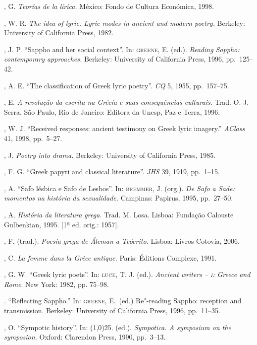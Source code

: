 \begin{bibliohedra}
, G. \textit{Teorías de la lírica.} México: Fondo de
Cultura Económica, 1998.

, W. R. \textit{The idea of lyric. Lyric modes in ancient and
modern poetry.} Berkeley: University of California Press, 1982.

, J. P. “Sappho and her social context”. In: \textsc{greene}, E.
(ed.). \textit{Reading Sappho: contemporary approaches.} Berkeley: University
of California Press, 1996, pp.~125--42.

, A. E. “The classification of Greek lyric poetry”. \textit{CQ}
5, 1955, pp.~157--75.

, E. \textit{A revolução da escrita na Grécia e suas
consequências culturais.} Trad. O. J. Serra. São Paulo, Rio de Janeiro: Editora
da Unesp, Paz e Terra, 1996.

, W. J. ``Received responses: ancient testimony on Greek lyric imagery.'' 
\textit{AClass} 41, 1998, pp.~5--27. 

, J. \textit{Poetry into drama.} Berkeley: University of
California Press, 1985.

, F. G. “Greek papyri and classical literature”.
\textit{JHS} 39, 1919, pp.~1--15.

, A. “Safo lésbica e Safo de Lesbos”. In: \textsc{bremmer}, J.
(org.). \textit{De Safo a Sade: momentos na história da sexualidade.} Campinas:
Papirus, 1995, pp.~27--50.

, A. \textit{História da literatura grega.} Trad. M. Losa. Lisboa:
Fundação Calouste Gulbenkian, 1995. [1ª ed. orig.: 1957].

, F. (trad.). \textit{Poesia grega de Álcman a Teócrito.}
Lisboa: Livros Cotovia, 2006.

, C. \textit{La femme dans la Grèce antique.} Paris: Éditions
Complexe, 1991.

, G. W. “Greek lyric poets”. In: \textsc{luce}, T. J. (ed.). \textit{Ancient writers -- \textsc{i}: Greece and Rome}. New York: 1982, pp. 75--98. 

\titidem. ``Reflecting Sappho.'' In: \textsc{greene}, E.~(ed.) 
Re"-reading Sappho: reception and transmission. Berkeley: University of California Press,
1996, pp.~11--35.

, O. “Sympotic history”. In: \line(1,0){25}. (ed.).
\textit{Sympotica. A symposium on the symposion.} Oxford: Clarendon Press,
1990, pp.~3--13.


\end{bibliohedra}
